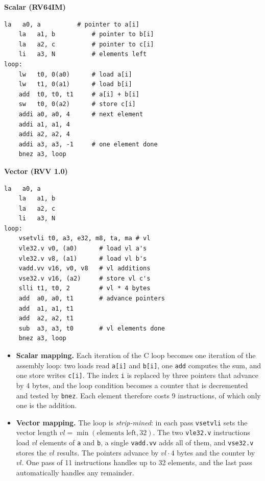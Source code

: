\documentclass[11pt,a4paper]{article}
\newcommand{\code}[1]{\texttt{#1}}
\begin{document}
\begin{minipage}[t]{0.47\textwidth}
\textbf{Scalar (RV64IM)}
\begin{lstlisting}[style=asm]
    la   a0, a          # pointer to a[i]
    la   a1, b          # pointer to b[i]
    la   a2, c          # pointer to c[i]
    li   a3, N          # elements left
loop:
    lw   t0, 0(a0)      # load a[i]
    lw   t1, 0(a1)      # load b[i]
    add  t0, t0, t1     # a[i] + b[i]
    sw   t0, 0(a2)      # store c[i]
    addi a0, a0, 4      # next element
    addi a1, a1, 4
    addi a2, a2, 4
    addi a3, a3, -1     # one element done
    bnez a3, loop
\end{lstlisting}
\end{minipage}\hfill
\begin{minipage}[t]{0.50\textwidth}
\textbf{Vector (RVV 1.0)}
\begin{lstlisting}[style=asm]
    la   a0, a
    la   a1, b
    la   a2, c
    li   a3, N
loop:
    vsetvli t0, a3, e32, m8, ta, ma # vl
    vle32.v v0, (a0)      # load vl a's
    vle32.v v8, (a1)      # load vl b's
    vadd.vv v16, v0, v8   # vl additions
    vse32.v v16, (a2)     # store vl c's
    slli t1, t0, 2        # vl * 4 bytes
    add  a0, a0, t1       # advance pointers
    add  a1, a1, t1
    add  a2, a2, t1
    sub  a3, a3, t0       # vl elements done
    bnez a3, loop
\end{lstlisting}
\end{minipage}

\begin{itemize}
  \item \textbf{Scalar mapping.} Each iteration of the C loop becomes one iteration of the
        assembly loop: two loads read \code{a[i]} and \code{b[i]}, one \code{add} computes the sum,
        and one store writes \code{c[i]}. The index \code{i} is replaced by three pointers that
        advance by 4 bytes, and the loop condition becomes a counter that is decremented and tested
        by \code{bnez}. Each element therefore costs 9 instructions, of which only one is the
        addition.
  \item \textbf{Vector mapping.} The loop is \emph{strip-mined}: in each pass \code{vsetvli}
        sets the vector length $vl = \min(\text{elements left}, 32)$. The two \code{vle32.v}
        instructions load $vl$ elements of \code{a} and \code{b}, a single \code{vadd.vv} adds all
        of them, and \code{vse32.v} stores the $vl$ results. The pointers advance by $vl \cdot 4$
        bytes and the counter by $vl$. One pass of 11 instructions handles up to 32 elements, and
        the last pass automatically handles any remainder.
\end{itemize}
\end{document}
